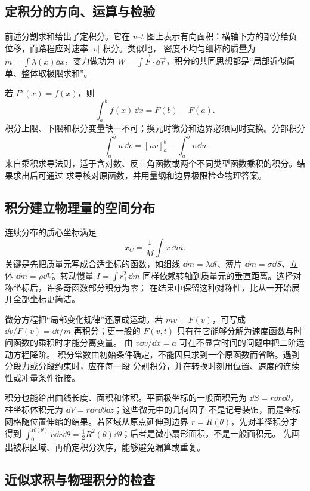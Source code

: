 \subsection{定积分的方向、运算与检验}

前述分割求和给出了定积分。它在 $v$--$t$ 图上表示有向面积：横轴下方的部分给负位移，而路程应对速率 $|v|$ 积分。类似地，
密度不均匀细棒的质量为 $m=\int\lambda(x)\dd x$，变力做功为
$W=\int\vec F\cdot\dd\vec r$，积分的共同思想都是“局部近似简单、整体取极限求和”。

若 $F'(x)=f(x)$，则
\[
 \int_a^b f(x)\,\dd x=F(b)-F(a).
\]
积分上限、下限和积分变量缺一不可；换元时微分和边界必须同时变换。分部积分
\[
 \int_a^b u\,\dd v=[uv]_a^b-\int_a^b v\,\dd u
\]
来自乘积求导法则，适于含对数、反三角函数或两个不同类型函数乘积的积分。结果求出后可通过
求导核对原函数，并用量纲和边界极限检查物理答案。

\subsection{积分建立物理量的空间分布}

连续分布的质心坐标满足
\[
 x_C=\frac1M\int x\,\dd m.
\]
关键是先把质量元写成合适坐标的函数，如细线 $\dd m=\lambda\dd l$、薄片
$\dd m=\sigma\dd S$、立体 $\dd m=\rho\dd V$。转动惯量
$I=\int r_\perp^2\dd m$ 同样依赖转轴到质量元的垂直距离。选择对称坐标后，许多奇函数部分积分为零；
在结果中保留这种对称性，比从一开始展开全部坐标更简洁。

微分方程把“局部变化规律”还原成运动。若 $m\dot v=F(v)$，可写成
$\dd v/F(v)=\dd t/m$ 再积分；更一般的 $F(v,t)$ 只有在它能够分解为速度函数与时间函数的乘积时才能分离变量。
由 $v\dd v/\dd x=a$ 可在不显含时间的问题中把二阶运动方程降阶。
积分常数由初始条件确定，不能因只求到一个原函数而省略。遇到分段力或分段约束时，应在每一段
分别积分，并在转换时刻用位置、速度的连续性或冲量条件衔接。

积分也能给出曲线长度、面积和体积。平面极坐标的一般面积元为
$\dd S=r\dd r\dd\theta$，柱坐标体积元为 $\dd V=r\dd r\dd\theta\dd z$；这些微元中的几何因子
不是记号装饰，而是坐标网格随位置伸缩的结果。若区域从原点延伸到边界 $r=R(\theta)$，先对半径积分才得到
$\int_0^{R(\theta)}r\dd r\dd\theta=\tfrac12R^2(\theta)\dd\theta$；后者是微小扇形面积，不是一般面积元。
先画出被积区域、再确定积分次序，能够避免漏算或重复。

\subsection{近似求积与物理积分的检查}

